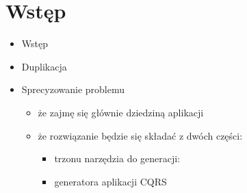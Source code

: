 \chapter{Wstęp} \label{chap:intro}

\begin{itemize}
 \item Wstęp
 
 \item Duplikacja
 
 \item Sprecyzowanie problemu
  \begin{itemize}
   \item że zajmę się głównie dziedziną aplikacji
   \item że rozwiązanie będzie się składać z dwóch części:
    \begin{itemize}
     \item trzonu narzędzia do generacji:
     \item generatora aplikacji CQRS
    \end{itemize}
  \end{itemize}
  

\end{itemize}
